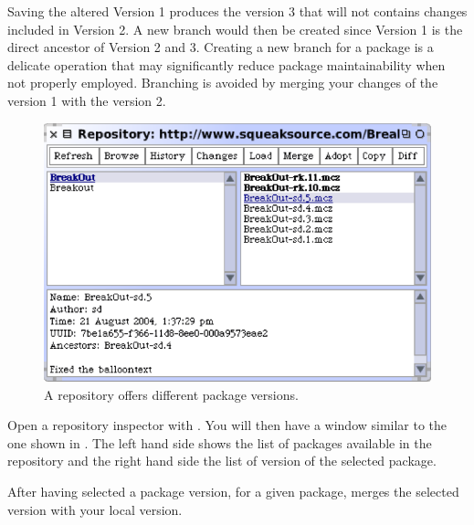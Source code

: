 \documentclass[a4paper,10pt,twoside]{book}
\begin{document}

Saving the altered Version 1 produces the version 3 that will not contains changes included in Version 2. A new branch would then be created since Version 1 is the direct ancestor of Version 2 and 3. Creating a new branch for a package is a delicate operation that may significantly reduce package maintainability when not properly employed. Branching is avoided by merging your changes of the version 1 with the version 2.

\begin{figure}[ht]\centering
	\includegraphics[width=.75\linewidth]{viewingRepository}
	\caption{A repository offers different package versions.}
\end{figure}

Open a repository inspector with . You will then have a window similar to the one shown in . The left hand side shows the list of packages available in the repository and the right hand side the list of version of the selected package.

After having selected a package version, for a given package,  merges the selected version with your local version. 

\end{document}
